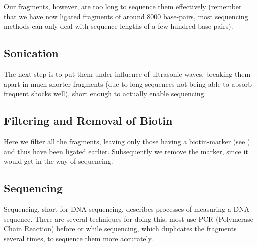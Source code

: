 Our fragments, however, are too long to sequence them effectively (remember
that we have now ligated fragments of around 8000 base-pairs, most sequencing
methods can only deal with sequence lengths of a few hundred base-pairs).

\subsection{Sonication}\label{sec:sonication}

The next step is to put them under influence of ultrasonic waves, breaking them
apart in much shorter fragments (due to long sequences not being able to absorb
frequent shocks well), short enough to actually enable sequencing.

\subsection{Filtering and Removal of Biotin}\label{sec:pulldown}

Here we filter all the fragments, leaving only those having a biotin-marker
(see ) and thus have been ligated earlier. Subsequently
we remove the marker, since it would get in the way of sequencing.

\subsection{Sequencing}\label{sec:sequencing}

Sequencing, short for DNA sequencing, describes processes of measuring a DNA
sequence. There are several techniques for doing this, most use PCR (Polymerase
Chain Reaction) before or while sequencing, which duplicates the fragments
several times, to sequence them more accurately.




